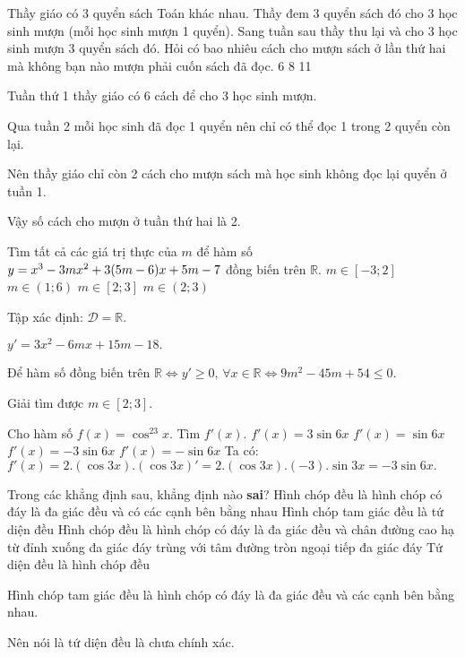 \begin{ex}%
	Thầy giáo có $ 3 $ quyển sách Toán khác nhau. Thầy đem 3 quyển sách đó cho 3 học sinh mượn (mỗi học sinh mượn 1 quyển). Sang tuần sau thầy thu lại và cho 3 học sinh mượn 3 quyển sách đó. Hỏi có bao nhiêu cách cho mượn sách ở lần thứ hai mà không bạn nào mượn phải cuốn sách đã đọc.
	\choice
	{6}
	{}
	{8}
	{11}
	\loigiai
	{
	
	Tuần thứ 1 thầy giáo có 6 cách để cho 3 học sinh mượn. 
	
	Qua tuần 2 mỗi học sinh đã đọc 1 quyển nên chỉ có thể đọc 1 trong 2 quyển còn lại.
	
	Nên thầy giáo chỉ còn 2 cách cho mượn sách mà học sinh không đọc lại quyển ở tuần 1.
	
	Vậy số cách cho mượn ở tuần thứ hai là 2.
		
	}
\end{ex}	
\begin{ex}%
	Tìm tất cả các giá trị thực của $ m $ để hàm số $\break  y = x^3 - 3mx^2 + 3(5m-6)x + 5m - 7 $ đồng biến trên $ \mathbb{R}. $
	\choice
	{$ m \in [-3;2] $}
	{$ m \in (1;6) $}
	{\True $ m \in [2;3] $}
	{$ m \in (2;3) $}
	\loigiai
	{	
	
	Tập xác định: $ \mathscr{D} = \mathbb{R}. $	
	
	$ y' = 3x^2 - 6mx + 15m - 18. $
	
	Để hàm số đồng biến trên $ \mathbb{R} \Leftrightarrow y' \geq 0, \, \forall x \in \mathbb{R} \Leftrightarrow 9m^2 - 45m +54 \leq 0.$
	
	Giải tìm được $ m \in [2;3]. $
	}
\end{ex}	
\begin{ex}%
	Cho hàm số $ f(x) = \cos^23x. $ Tìm $ f'(x). $
	\choice
	{$ f'(x) = 3 \sin 6x $}
	{$ f'(x)=\sin 6x $}
	{\True $ f'(x) = -3 \sin 6x $}
	{$ f'(x) = - \sin 6x $}
	\loigiai
	{	
Ta có:	$ f'(x) = 2.\left(\cos 3x\right).\left(\cos 3x\right)' = 2. \left(\cos 3x\right).(-3).\sin 3x = -3 \sin 6x.$	
	}
\end{ex}	
\begin{ex}%
	Trong các khẳng định sau, khẳng định nào \textbf{sai}?
	\choice
	{Hình chóp đều là hình chóp có đáy là đa giác đều và có các cạnh bên bằng nhau}
	{\True Hình chóp tam giác đều là tứ diện đều}
	{Hình chóp đều là hình chóp có đáy là đa giác đều và chân đường cao hạ từ đỉnh xuống đa giác đáy trùng với tâm đường tròn ngoại tiếp đa giác đáy}
	{Tứ diện đều là hình chóp đều}
	\loigiai
	{	

	Hình chóp tam giác đều là hình chóp có đáy là đa giác đều và các cạnh bên bằng nhau. 
	
	Nên nói là tứ diện đều là chưa chính xác.	
	}
\end{ex}	
